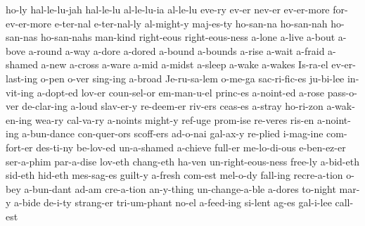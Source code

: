 ho-ly
hal-le-lu-jah
hal-le-lu
al-le-lu-ia
al-le-lu
eve-ry
ev-er
nev-er
ev-er-more
for-ev-er-more
e-ter-nal
e-ter-nal-ly
al-might-y
maj-es-ty
ho-san-na
ho-san-nah
ho-san-nas
ho-san-nahs
man-kind
right-eous
right-eous-ness
a-lone
a-live
a-bout
a-bove
a-round
a-way
a-dore
a-dored
a-bound
a-bounds
a-rise
a-wait
a-fraid
a-shamed
a-new
a-cross
a-ware
a-mid
a-midst
a-sleep
a-wake
a-wakes
Is-ra-el
ev-er-last-ing
o-pen
o-ver
sing-ing
a-broad
Je-ru-sa-lem
o-me-ga
sac-ri-fic-es
ju-bi-lee
in-vit-ing
a-dopt-ed
lov-er
coun-sel-or
em-man-u-el
princ-es
a-noint-ed
a-rose
pass-o-ver
de-clar-ing
a-loud
slav-er-y
re-deem-er
riv-ers
ceas-es
a-stray
ho-ri-zon
a-wak-en-ing
wea-ry
cal-va-ry
a-noints
might-y
ref-uge
prom-ise
re-veres
ris-en
a-noint-ing
a-bun-dance
con-quer-ors
scoff-ers
ad-o-nai
gal-ax-y
re-plied
i-mag-ine
com-fort-er
des-ti-ny
be-lov-ed
un-a-shamed
a-chieve
full-er
me-lo-di-ous
e-ben-ez-er
ser-a-phim
par-a-dise
lov-eth
chang-eth
ha-ven
un-right-eous-ness
free-ly
a-bid-eth
sid-eth
hid-eth
mes-sag-es
guilt-y
a-fresh
com-est
mel-o-dy
fall-ing
recre-a-tion
o-bey
a-bun-dant
ad-am
cre-a-tion
an-y-thing
un-change-a-ble
a-dores
to-night
mar-y
a-bide
de-i-ty
strang-er
tri-um-phant
no-el
a-feed-ing
si-lent
ag-es
gal-i-lee
call-est
